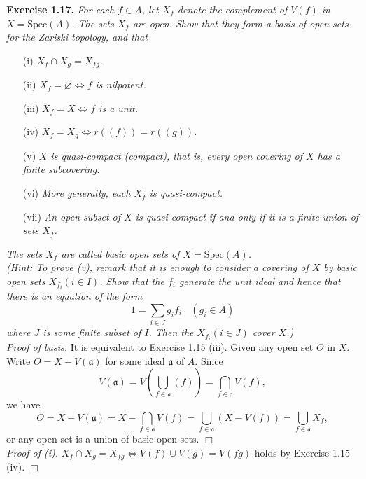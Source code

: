 \documentclass{article}
\begin{document}



\textbf{Exercise 1.17.}
\emph{For each $f \in A$,
let $X_f$ denote the complement of $V(f)$ in $X = \text{Spec}(A)$.
The sets $X_f$ are open.
Show that they form a basis of open sets for the Zariski topology, and that}
\begin{enumerate}
\item[(i)]
\emph{$X_f \cap X_g = X_{fg}$.}
\item[(ii)]
\emph{$X_f = \varnothing \Longleftrightarrow f$ is nilpotent.}
\item[(iii)]
\emph{$X_f = X \Longleftrightarrow f$ is a unit.}
\item[(iv)]
\emph{$X_f = X_g \Longleftrightarrow r((f)) = r((g))$.}
\item[(v)]
\emph{$X$ is quasi-compact (compact), that is,
every open covering of $X$ has a finite subcovering.}
\item[(vi)]
\emph{More generally, each $X_f$ is quasi-compact.}
\item[(vii)]
\emph{An open subset of $X$ is quasi-compact if and only if
it is a finite union of sets $X_f$.}
\end{enumerate}

\emph{The sets $X_f$ are called basic open sets of
$X = \text{Spec}(A)$.} \\

\emph{(Hint: To prove (v), remark that it is enough to consider a covering of $X$
by basic open sets $X_{f_i} (i \in I)$.
Show that the $f_i$ generate the unit ideal and hence that
there is an equation of the form
$$1 = \sum_{i \in J} g_i f_i \:\:\:\: (g_i \in A)$$
where $J$ is some finite subset of $I$.
Then the $X_{f_i} (i \in J)$ cover $X$.)} \\

\emph{Proof of basis.}
It is equivalent to Exercise 1.15 (iii).
Given any open set $O$ in $X$.
Write $O = X - V(\mathfrak{a})$ for some ideal $\mathfrak{a}$ of $A$.
Since
$$V(\mathfrak{a})
= V \left( \bigcup_{f \in \mathfrak{a}} (f) \right)
= \bigcap_{f \in \mathfrak{a}} V(f),$$
we have
$$O
= X - V(\mathfrak{a})
= X - \bigcap_{f \in \mathfrak{a}} V(f)
= \bigcup_{f \in \mathfrak{a}} (X - V(f))
= \bigcup_{f \in \mathfrak{a}} X_f,$$
or any open set is a union of basic open sets.
$\Box$ \\

\emph{Proof of (i).}
$X_f \cap X_g = X_{fg} \Longleftrightarrow V(f) \cup V(g) = V(fg)$ holds by Exercise 1.15 (iv).
$\Box$ \\
\end{document}
